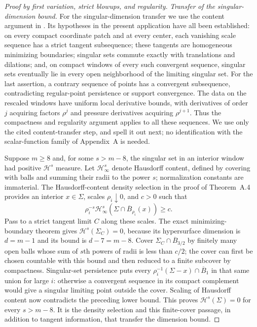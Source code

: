 \begin{proof}[Proof by first variation, strict blowups, and regularity]
\emph{Transfer of the singular-dimension bound.}
For the singular-dimension transfer we use the content argument in
\citet[Chapter~1, Theorem~3.26(2), and Appendix~A, proof of Theorem~A.4,
step~(1)]{simonGMT}.
Its hypotheses in the present application have all been established:
on every compact coordinate patch and at every center, each vanishing
scale sequence has a strict tangent subsequence; these tangents are
homogeneous minimizing boundaries; singular sets commute exactly with
translations and dilations; and, on compact windows of every such
convergent sequence, singular sets eventually lie in every open
neighborhood of the limiting singular set.  For the last assertion,
a contrary sequence of points has a convergent subsequence, contradicting
regular-point persistence or support convergence.  The data on the
rescaled windows have uniform local derivative bounds, with derivatives
of order $j$ acquiring factors $\rho^j$ and pressure derivatives acquiring
$\rho^{j+1}$.  Thus the compactness and regularity argument applies to
all these sequences.  We use only the cited content-transfer step, and
spell it out next; no identification with the scalar-function family
of Appendix~A is needed.

Suppose $m\ge8$ and, for some
$s>m-8$, the singular set in an interior window had positive
$\mathcal H^s$ measure.  Let $\mathcal H^s_\infty$ denote Hausdorff
content, defined by covering with balls and summing their radii to
the power $s$; normalization constants are immaterial.
The Hausdorff-content density selection in the proof of Theorem~A.4
provides an interior $x\in\Sigma$, scales $\rho_i\downarrow0$, and
$c>0$ such that
\[
       \rho_i^{-s}\mathcal H^s_\infty
               (\Sigma\cap\overline B_{\rho_i}(x))\ge c.
\]
Pass to a strict tangent limit $C$ along these scales.  The exact
minimizing-boundary theorem gives
$\mathcal H^s(\Sigma_C)=0$, because its hypersurface dimension is
$d=m-1$ and its bound is $d-7=m-8$.
Cover $\Sigma_C\cap\overline B_{3/2}$ by finitely many open balls
whose sum of $s$th powers of radii is less than $c/2$; the cover can
first be chosen countable with this bound and then reduced to a finite
subcover by compactness.  Singular-set persistence puts every
$\rho_i^{-1}(\Sigma-x)\cap\overline B_1$ in that same union for large
$i$: otherwise a convergent sequence in its compact complement would
give a singular limiting point outside the cover.  Scaling of
Hausdorff content now contradicts the preceding lower bound.
This proves $\mathcal H^s(\Sigma)=0$ for every $s>m-8$.
It is the density selection and this finite-cover passage, in addition
to tangent information, that transfer the dimension bound.


\end{proof}

